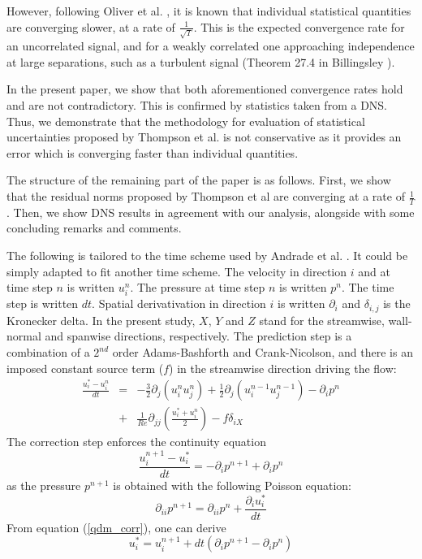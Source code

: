 \documentclass[aip,pof,reprint]{revtex4-1}
\begin{document}
However, following Oliver et al. \cite{oliver}, it is known that individual statistical quantities are converging slower, at a rate of $\frac{1}{\sqrt{T}}$.
This is the expected convergence rate for an uncorrelated signal, and for a weakly correlated one approaching independence at large separations, such as a turbulent signal (Theorem 27.4 in Billingsley \cite{billingsley2008probability}).

In the present paper, we show that both aforementioned convergence rates hold and are not contradictory.
This is confirmed by statistics taken from a DNS.
Thus, we demonstrate that the methodology for evaluation of statistical uncertainties proposed by Thompson et al. \cite{thompson} is not conservative as it provides an error which is converging faster than individual quantities.

The structure of the remaining part of the paper is as follows.
First, we show that the residual norms proposed by Thompson et al \cite{thompson} are converging at a rate of $\frac{1}{T}$.
Then, we show DNS results in agreement with our analysis, alongside with some concluding remarks and comments.

The following is tailored to the time scheme used by Andrade et al. \cite{andrade}.
It could be simply adapted to fit another time scheme.
The velocity in direction $i$ and at time step $n$ is written $u_i^n$.
The pressure at time step $n$ is written $p^n$.
The time step is written $dt$.
Spatial derivativation in direction $i$ is written $\partial_i$ and $\delta_{i,j}$ is the Kronecker delta.
In the present study, $X$, $Y$ and $Z$ stand for the streamwise, wall-normal and spanwise directions, respectively.
The prediction step is a combination of a $2^{nd}$ order Adams-Bashforth and Crank-Nicolson, and there is an imposed constant source term ($f$) in the streamwise direction driving the flow:
\begin{eqnarray}
\label{qdm_pred}
\frac{u_i^*-u_i^n}{dt}
& = &
- \frac{3}{2} \partial_j \left( u_i^n u_j^n \right)
+ \frac{1}{2} \partial_j \left( u_i^{n-1} u_j^{n-1} \right)
- \partial_i p^n \nonumber \\
& + & \frac{1}{Re} \partial_{jj} \left( \frac{u_i^* + u_i^n}{2} \right)
- f \delta_{iX}
\end{eqnarray}
The correction step enforces the continuity equation
\begin{equation}
\label{qdm_corr}
\frac{u_i^{n+1}-u_i^*}{dt} = - \partial_i p^{n+1} + \partial_i p^{n}
\end{equation}
as the pressure $p^{n+1}$ is obtained with the following Poisson equation:
\begin{equation}
\label{qdm_poisson}
\partial_{ii} p^{n+1} = \partial_{ii} p^{n} + \frac{\partial_i u_i^*}{dt}
\end{equation}
From equation (\ref{qdm_corr}), one can derive
\begin{equation}
\label{qdm_ustar}
u_i^* = u_i^{n+1} + dt \left( \partial_i p^{n+1} - \partial_i p^{n} \right)
\end{equation}
\end{document}
